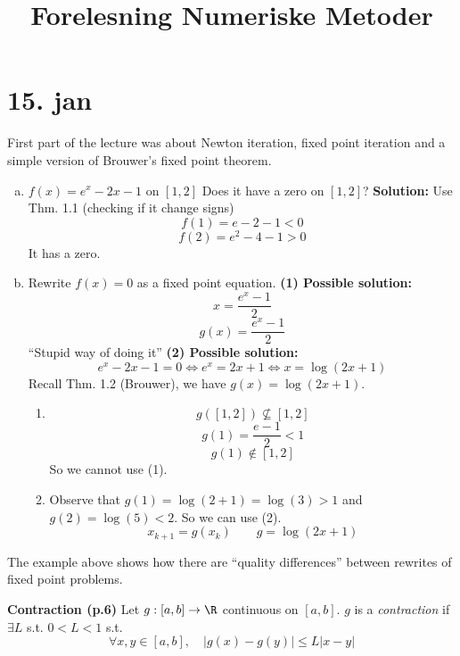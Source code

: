 \title{Forelesning Numeriske Metoder}
\maketitle
\section*{15. jan}
First part of the lecture was about Newton iteration, fixed point iteration and a simple version of Brouwer's fixed point theorem.
\begin{example}\label{ex1}
  \begin{enumerate}[(a)]
    \item
      $f(x)=e^x-2x-1$ on $[1,2]$
      Does it have a zero on $[1,2]$?
      \newline
      \textbf{Solution:}
      Use Thm. 1.1 (checking if it change signs)
      $$f(1)=e-2-1 <0$$
      $$f(2)=e^2-4-1 >0$$
      It has a zero.
    \item
      Rewrite $f(x)=0$ as a fixed point equation.
      \newline
      \textbf{(1) Possible solution:}
      $$x=\frac{e^x-1}{2}$$
      $$g(x)=\frac{e^x-1}{2}$$
      ``Stupid way of doing it''
      \textbf{(2) Possible solution:}
      $$e^x-2x-1=0 \Leftrightarrow e^x=2x+1 \Leftrightarrow x=\log(2x+1)$$
      Recall Thm. 1.2 (Brouwer), we have $g(x)=\log(2x+1)$.
      \begin{enumerate}[(1)]
        \item
          $$g([1,2])\not\subseteq [1,2]$$
          $$g(1)=\frac{e-1}{2}<1$$
          $$g(1)\not\in [1,2]$$
          So we cannot use (1).
        \item
          Observe that $g(1)=\log(2+1)=\log(3)>1$ and $g(2)=\log(5)<2$. So we can use (2).
          $$x_{k+1}=g(x_k) \qquad g=\log(2x+1)$$
      \end{enumerate}
  \end{enumerate}
\end{example}
\begin{remark}
  The example above shows how there are ``quality differences'' between rewrites of fixed point problems.
\end{remark}
\begin{definition}
  \textbf{Contraction (p.6)}
  \newline
  Let $g:[a,b]\to \R$ continuous on $[a,b]$. $g$ is a \emph{contraction} if $\exists L$ s.t. $0<L<1$ s.t.
    $$\forall x,y\in [a,b], \quad |g(x)-g(y)| \leq L|x-y|$$
\end{definition}


